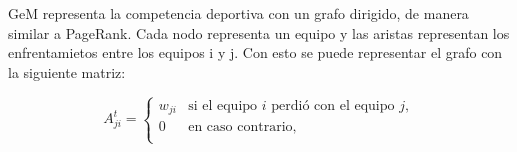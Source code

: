 GeM representa la competencia deportiva con un grafo dirigido, de manera similar a PageRank. Cada nodo representa un equipo y las aristas representan los enfrentamietos entre los equipos i y j. Con esto se puede representar el grafo con la siguiente matriz:

\begin{equation*}
A_{ji}^t = \left\{
  \begin{array}{cl}
  w_{ji} & \text{si el equipo } i \text{ perdi\'o con el equipo } j,\\
  0 & \text{en caso contrario, }\\
  \end{array} \right.
\end{equation*}



